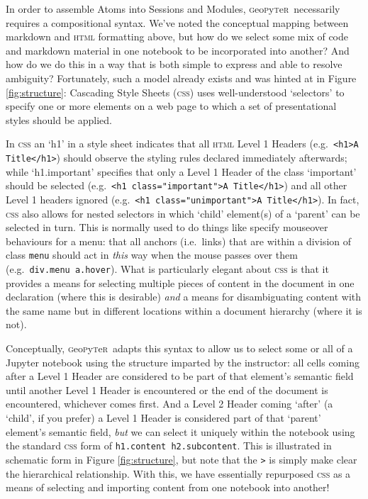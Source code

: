 \documentclass[letter, 11pt,titlepage]{article}
\newcommand{\gp}{\textsc{g}eo\textsc{p}y\textsc{t}e\textsc{r}~\/}
\newcommand{\eg}{e.g.~\/}
\newcommand{\ie}{i.e.~\/}
\begin{document}
In order to assemble Atoms into Sessions and Modules, \gp necessarily requires a compositional syntax. We've noted the conceptual mapping between markdown and \textsc{html} formatting above, but how do we select some mix of code and markdown material in one notebook to be incorporated into another? And how do we do this in a way that is both simple to express and able to resolve ambiguity? Fortunately, such a model already exists and was hinted at in Figure \ref{fig:structure}: Cascading Style Sheets (\textsc{css}) uses well-understood `selectors' to specify one or more elements on a web page to which a set of presentational styles should be applied. 

In \textsc{css} an `h1' in a style sheet indicates that all \textsc{html} Level 1 Headers (\eg \texttt{<h1>A Title</h1>}) should observe the styling rules declared immediately afterwards; while `h1.important' specifies that only a Level 1 Header of the class `important' should be selected (\eg \texttt{<h1 class="important">A Title</h1>}) and all other Level 1 headers ignored (\eg \texttt{<h1 class="unimportant">A Title</h1>}). In fact, \textsc{css} also allows for nested selectors in which `child' element(s) of a `parent' can be selected in turn. This is normally used to do things like specify mouseover behaviours for a menu: that all anchors (\ie links) that are within a division of class \texttt{menu} should act in \emph{this} way when the mouse passes over them (\eg \texttt{div.menu a.hover}). What is particularly elegant about \textsc{css} is that it provides a means for selecting multiple pieces of content in the document in one declaration (where this is desirable) \emph{and} a means for disambiguating content with the same name but in different locations within a document hierarchy (where it is not). 

Conceptually, \gp adapts this syntax to allow us to select some or all of a Jupyter notebook using the structure imparted by the instructor: all cells coming after a Level 1 Header are considered to be part of that element's semantic field until another Level 1 Header is encountered or the end of the document is encountered, whichever comes first. And a Level 2 Header coming `after' (a `child', if you prefer) a Level 1 Header is considered part of that `parent' element's semantic field, \emph{but} we can select it uniquely within the notebook using the standard \textsc{css} form of \texttt{h1.content h2.subcontent}. This is illustrated in schematic form in Figure \ref{fig:structure}, but note that the \texttt{>} is simply make clear the hierarchical relationship. With this, we have essentially repurposed \textsc{css} as a means of selecting and importing content from one notebook into another!
\end{document}
